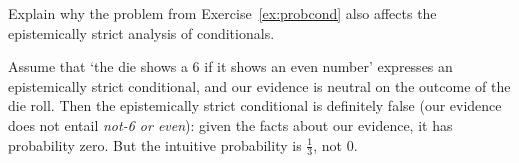 
  



\begin{exercise}
  Explain why the problem from Exercise~\ref{ex:probcond} also affects the
  epistemically strict analysis of conditionals.
\end{exercise}
\begin{solution}
  Assume that `the die shows a 6 if it shows an even number' expresses an
  epistemically strict conditional, and our evidence is neutral on the outcome
  of the die roll. Then the epistemically strict conditional is definitely false
  (our evidence does not entail \emph{not-6 or even}): given the facts about our
  evidence, it has probability zero. But the intuitive probability is
  $\frac{1}{3}$, not 0.
\end{solution}

